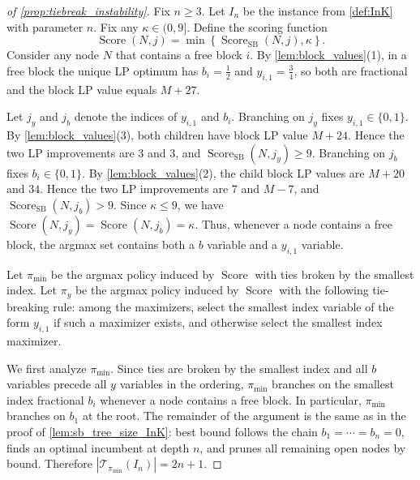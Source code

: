 \documentclass[smallextended,envcountsect]{svjour3} %
\newcommand{\set}[1]{\left\{#1\right\}}
\newcommand{\Tcal}{\mathcal{T}}
\newcommand{\0}{\mathbf{0}}
\DeclareMathOperator{\Score}{Score} %
\newcommand{\1}{\mathbf{1}} %
\begin{document}
\begin{proof}[of \cref{prop:tiebreak_instability}]
	Fix $n\ge 3$.
	Let $I_n$ be the instance from \cref{def:InK} with parameter $n$.
	Fix any $\kappa\in(0,9]$.
	Define the scoring function
	\[
		\Score(N,j)=\min\set{\Score_{\mathrm{SB}}(N,j),\kappa}.
	\]
	Consider any node $N$ that contains a free block $i$.
	By \cref{lem:block_values}(1), in a free block the unique LP optimum has $b_i=\tfrac12$ and $y_{i,1}=\tfrac34$, so both are fractional and the block LP value equals $M+27$.

	Let $j_y$ and $j_b$ denote the indices of $y_{i,1}$ and $b_i$.
	Branching on $j_y$ fixes $y_{i,1}\in\{0,1\}$.
	By \cref{lem:block_values}(3), both children have block LP value $M+24$.
	Hence the two LP improvements are $3$ and $3$, and $\Score_{\mathrm{SB}}(N,j_y)\ge 9$.
	Branching on $j_b$ fixes $b_i\in\{0,1\}$.
	By \cref{lem:block_values}(2), the child block LP values are $M+20$ and $34$.
	Hence the two LP improvements are $7$ and $M-7$, and $\Score_{\mathrm{SB}}(N,j_b)>9$.
	Since $\kappa\le 9$, we have $\Score(N,j_y)=\Score(N,j_b)=\kappa$.
	Thus, whenever a node contains a free block, the argmax set contains both a $b$ variable and a $y_{i,1}$ variable.

	Let $\pi_{\min}$ be the argmax policy induced by $\Score$ with ties broken by the smallest index.
	Let $\pi_y$ be the argmax policy induced by $\Score$ with the following tie-breaking rule: among the
	maximizers, select the smallest index variable of the form $y_{i,1}$ if such a maximizer exists, and
	otherwise select the smallest index maximizer.

	We first analyze $\pi_{\min}$.
	Since ties are broken by the smallest index and all $b$ variables precede all $y$ variables in the ordering, $\pi_{\min}$ branches on the smallest index fractional $b_i$ whenever a node contains a free block.
	In particular, $\pi_{\min}$ branches on $b_1$ at the root.
	The remainder of the argument is the same as in the proof of \cref{lem:sb_tree_size_InK}: best bound follows the chain $b_1=\cdots=b_n=0$, finds an optimal incumbent at depth $n$, and prunes all remaining open nodes by bound.
	Therefore $|\Tcal_{\pi_{\min}}(I_n)|=2n+1$.


\end{proof}
\end{document}
